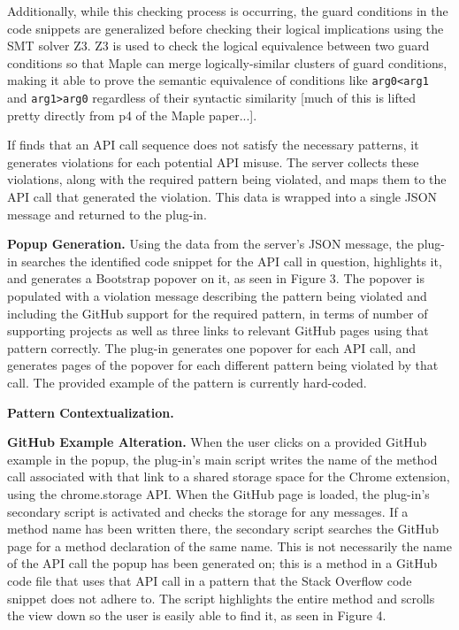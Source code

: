 Additionally, while this checking process is occurring, the guard conditions in the code snippets are generalized before checking their logical implications using the SMT solver Z3. Z3 is used to check the logical equivalence between two guard conditions so that Maple can merge logically-similar clusters of guard conditions, making it able to prove the semantic equivalence of conditions like {\tt arg0<arg1} and {\tt arg1>arg0} regardless of their syntactic similarity [much of this is lifted pretty directly from p4 of the Maple paper...].

If {\soa} finds that an API call sequence does not satisfy the necessary patterns, it generates violations for each potential API misuse. The server collects these violations, along with the required pattern being violated, and maps them to the API call that generated the violation. This data is wrapped into a single JSON message and returned to the plug-in.

{\bf Popup Generation.} Using the data from the server's JSON message, the plug-in searches the identified code snippet for the API call in question, highlights it, and generates a Bootstrap popover on it, as seen in Figure 3. The popover is populated with a violation message describing the pattern being violated and including the GitHub support for the required pattern, in terms of number of supporting projects as well as three links to relevant GitHub pages using that pattern correctly. The plug-in generates one popover for each API call, and generates pages of the popover for each different pattern being violated by that call. The provided example of the pattern is currently hard-coded.

{\bf Pattern Contextualization.} 

{\bf GitHub Example Alteration.} When the user clicks on a provided GitHub example in the popup, the plug-in's main script writes the name of the method call associated with that link to a shared storage space for the Chrome extension, using the chrome.storage API. When the GitHub page is loaded, the plug-in's secondary script is activated and checks the storage for any messages. If a method name has been written there, the secondary script searches the GitHub page for a method declaration of the same name. This is not necessarily the name of the API call the popup has been generated on; this is a method in a GitHub code file that uses that API call in a pattern that the Stack Overflow code snippet does not adhere to. The script highlights the entire method and scrolls the view down so the user is easily able to find it, as seen in Figure 4.

